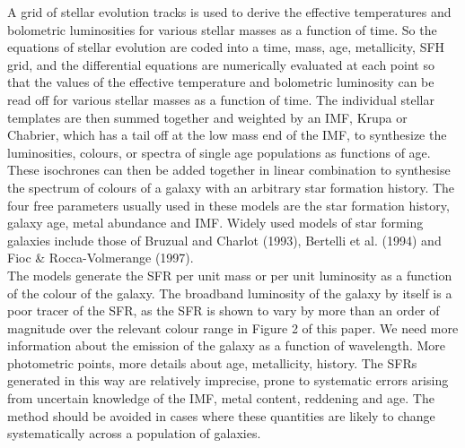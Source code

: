 \documentclass{literature}
\begin{document}
A grid of stellar evolution tracks is used to derive the effective temperatures and bolometric luminosities for various stellar masses as a function of time. So the equations of stellar evolution are coded into a time, mass, age, metallicity, SFH grid, and the differential equations are numerically evaluated at each point so that the values of the effective temperature and bolometric luminosity can be read off for various stellar masses as a function of time. The individual stellar templates are then summed together and weighted by an IMF, Krupa or Chabrier, which has a tail off at the low mass end of the IMF, to synthesize the luminosities, colours, or spectra of single age populations as functions of age. These isochrones can then be added together in linear combination to synthesise the spectrum of colours of a galaxy with an arbitrary star formation history. The four free parameters usually used in these models are the star formation history, galaxy age, metal abundance and IMF. Widely used models of star forming galaxies include those of Bruzual and Charlot  (1993), Bertelli et al. (1994) and Fioc \& Rocca-Volmerange (1997). \\ 
The models generate the SFR per unit mass or per unit luminosity as a function of the colour of the galaxy. The broadband luminosity of the galaxy by itself is a poor tracer of the SFR, as the SFR is shown to vary by more than an order of magnitude over the relevant colour range in Figure 2 of this paper. We need more information about the emission of the galaxy as a function of wavelength. More photometric points, more details about age, metallicity, history. The SFRs generated in this way are relatively imprecise, prone to systematic errors arising from uncertain knowledge of the IMF, metal content, reddening and age. The method should be avoided in cases where these quantities are likely to change systematically across a population of galaxies. \\ 
\end{document}
